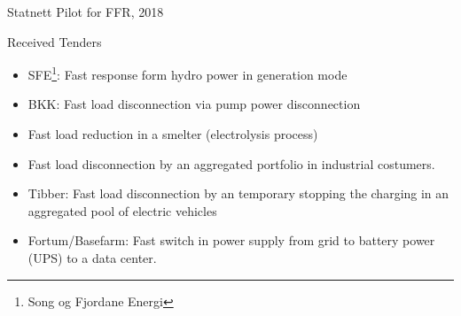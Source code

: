 \documentclass{beamer}
\begin{document}
\begin{frame}{Statnett Pilot for FFR, 2018}
\begin{block}{Received Tenders}
\begin{itemize}
\item SFE\footnote{Song og Fjordane Energi}: Fast response form hydro power in generation mode
\item BKK: Fast load disconnection via pump power disconnection
\item Fast load reduction in a smelter (electrolysis process)
\item Fast load disconnection by an aggregated portfolio in industrial costumers.
\item Tibber: Fast load disconnection by an temporary stopping the charging in an aggregated pool of electric vehicles
\item Fortum/Basefarm: Fast switch in power supply from grid to battery power (UPS) to a data center. 
\end{itemize}
\end{block}
\end{frame}
\end{document}
